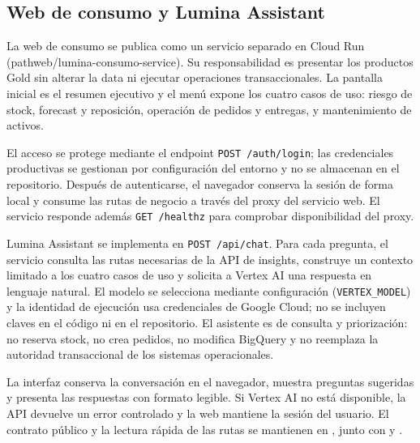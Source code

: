 \documentclass[11pt]{article}
\begin{document}
\subsection{Web de consumo y Lumina Assistant}
La web de consumo se publica como un servicio separado en Cloud Run (path{web/lumina-consumo-service}). Su responsabilidad es presentar los productos Gold sin alterar la data ni ejecutar operaciones transaccionales. La pantalla inicial es el resumen ejecutivo y el menú expone los cuatro casos de uso: riesgo de stock, forecast y reposición, operación de pedidos y entregas, y mantenimiento de activos.\par
El acceso se protege mediante el endpoint \texttt{POST /auth/login}; las credenciales productivas se gestionan por configuración del entorno y no se almacenan en el repositorio. Después de autenticarse, el navegador conserva la sesión de forma local y consume las rutas de negocio a través del proxy del servicio web. El servicio responde además \texttt{GET /healthz} para comprobar disponibilidad del proxy.\par
Lumina Assistant se implementa en \texttt{POST /api/chat}. Para cada pregunta, el servicio consulta las rutas necesarias de la API de insights, construye un contexto limitado a los cuatro casos de uso y solicita a Vertex AI una respuesta en lenguaje natural. El modelo se selecciona mediante configuración (\texttt{VERTEX\_MODEL}) y la identidad de ejecución usa credenciales de Google Cloud; no se incluyen claves en el código ni en el repositorio. El asistente es de consulta y priorización: no reserva stock, no crea pedidos, no modifica BigQuery y no reemplaza la autoridad transaccional de los sistemas operacionales.\par
La interfaz conserva la conversación en el navegador, muestra preguntas sugeridas y presenta las respuestas con formato legible. Si Vertex AI no está disponible, la API devuelve un error controlado y la web mantiene la sesión del usuario. El contrato público y la lectura rápida de las rutas se mantienen en , junto con  y .\par
\end{document}
